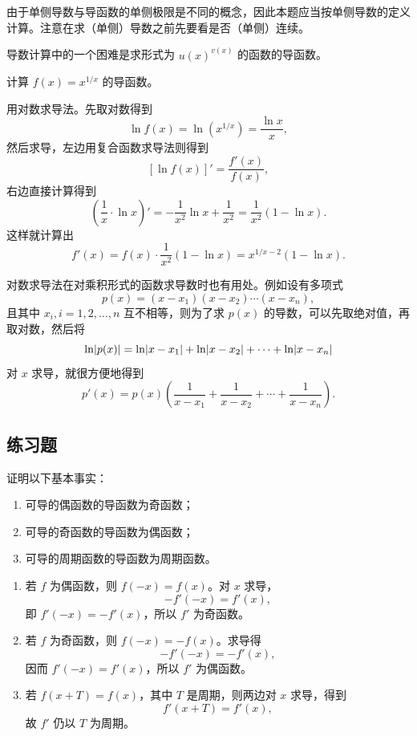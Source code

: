 \begin{xremark}
由于单侧导数与导函数的单侧极限是不同的概念，因此本题应当按单侧导数的定义计算。注意在求（单侧）导数之前先要看是否（单侧）连续。
\end{xremark}

导数计算中的一个困难是求形式为 $u(x)^{v(x)}$ 的函数的导函数。

\begin{xexample}[6.1.7]
计算 $f(x)=x^{1/x}$ 的导函数。
\end{xexample}
\begin{xsolution}
用对数求导法。先取对数得到
\[
  \ln f(x)=\ln(x^{1/x})=\frac{\ln x}{x},
\]
然后求导，左边用复合函数求导法则得到
\[
  [\ln f(x)]'=\frac{f'(x)}{f(x)},
\]
右边直接计算得到
\[
  \left(\frac1x\cdot\ln x\right)'=-\frac{1}{x^2}\ln x+\frac{1}{x^2}=\frac{1}{x^2}(1-\ln x).
\]
这样就计算出
\[
  f'(x)=f(x)\cdot\frac{1}{x^2}(1-\ln x)=x^{1/x-2}(1-\ln x).
\]
\end{xsolution}

\begin{xremark}
对数求导法在对乘积形式的函数求导数时也有用处。例如设有多项式
\[
  p(x)=(x-x_1)(x-x_2)\cdots(x-x_n),
\]
且其中 $x_i,i=1,2,\ldots,n$ 互不相等，则为了求 $p(x)$ 的导数，可以先取绝对值，再取对数，然后将
\[
  \ln\lvert p(x)\rvert=\ln\lvert x-x_1\rvert+\ln\lvert x-x_2\rvert+\cdots+\ln\lvert x-x_n\rvert
\]
对 $x$ 求导，就很方便地得到
\[
  p'(x)=p(x)\left(\frac1{x-x_1}+\frac1{x-x_2}+\cdots+\frac1{x-x_n}\right).
\]
\end{xremark}

\subsection{练习题}

\begin{xexercise}[1]
证明以下基本事实：
  \begin{enumerate}[label=(\arabic*)]
    \item 可导的偶函数的导函数为奇函数；
    \item 可导的奇函数的导函数为偶函数；
    \item 可导的周期函数的导函数为周期函数。
  \end{enumerate}
\end{xexercise}
\begin{xsolution}
\begin{enumerate}[label=(\arabic*)]
  \item 若 $f$ 为偶函数，则 $f(-x)=f(x)$。对 $x$ 求导，
  \[
    -f'(-x)=f'(x),
  \]
  即 $f'(-x)=-f'(x)$，所以 $f'$ 为奇函数。

  \item 若 $f$ 为奇函数，则 $f(-x)=-f(x)$。求导得
  \[
    -f'(-x)=-f'(x),
  \]
  因而 $f'(-x)=f'(x)$，所以 $f'$ 为偶函数。

  \item 若 $f(x+T)=f(x)$，其中 $T$ 是周期，则两边对 $x$ 求导，得到
  \[
    f'(x+T)=f'(x),
  \]
  故 $f'$ 仍以 $T$ 为周期。
\end{enumerate}
\end{xsolution}


